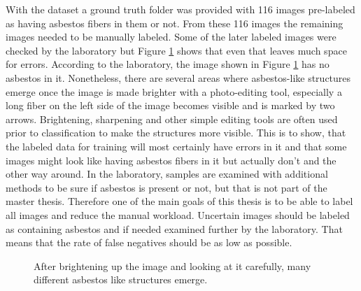 With the dataset a ground truth folder was provided with 116 images pre-labeled as having asbestos fibers in them or not. From these 116 images the remaining images needed to be manually labeled. Some of the later labeled images were checked by the laboratory but Figure \ref{fig:wrong_asbestos_labeling} shows that even that leaves much space for errors.  According to the laboratory, the image shown in Figure \ref{fig:wrong_asbestos_labeling} has no asbestos in it. Nonetheless, there are several areas where asbestos-like structures emerge once the image is made brighter with a photo-editing tool, especially a long fiber on the left side of the image becomes visible and is marked by two arrows. Brightening, sharpening and other simple editing tools are often used prior to classification to make the structures more visible. This is to show, that the labeled data for training will most certainly have errors in it and that some images might look like having asbestos fibers in it but actually don't and the other way around. In the laboratory, samples are examined with additional methods to be sure if asbestos is present or not, but that is not part of the master thesis. Therefore one of the main goals of this thesis is to be able to label all images and reduce the manual workload. Uncertain images should be labeled as containing asbestos and if needed examined further by the laboratory. That means that the rate of false negatives should be as low as possible.

\begin{figure}[h]
\centering
{}
\caption{After brightening up the image and looking at it carefully, many different asbestos like structures emerge.}
\label{fig:wrong_asbestos_labeling}
\end{figure}


